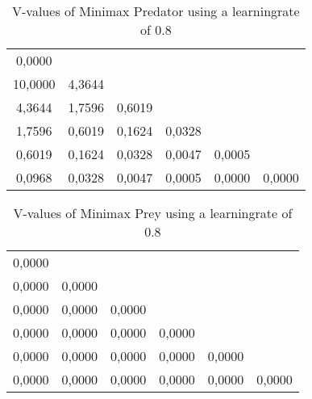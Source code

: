 \begin{table}[htb]
\centering
\begin{tabular}{cccccc}
0,0000 &  &  &  &  & \\
10,0000 & 4,3644 &  &  &  & \\ 
4,3644 & 1,7596 & 0,6019 &  &  & \\
1,7596 & 0,6019 & 0,1624 & 0,0328 &  & \\ 
0,6019 & 0,1624 & 0,0328 & 0,0047 & 0,0005 & \\ 
0,0968 & 0,0328 & 0,0047 & 0,0005 & 0,0000 & 0,0000\\ 
\end{tabular}
\caption{V-values of Minimax Predator using a learningrate of 0.8}
\label{tab:predM}
\end{table}

\begin{table}[htb]
\centering
\begin{tabular}{cccccc}
0,0000 &  &  &  &  & \\ 
0,0000 & 0,0000 &  &  &  & \\ 
0,0000 & 0,0000 & 0,0000 &  &  & \\ 
0,0000 & 0,0000 & 0,0000 & 0,0000 &  & \\ 
0,0000 & 0,0000 & 0,0000 & 0,0000 & 0,0000 & \\ 
0,0000 & 0,0000 & 0,0000 & 0,0000 & 0,0000 & 0,0000\\ 
\end{tabular}
\caption{V-values of Minimax Prey using a learningrate of 0.8}
\label{tab:preyM}
\end{table}

\FloatBarrier

\subsection*{}